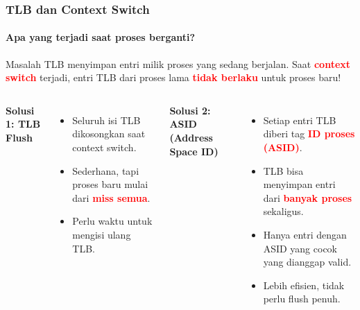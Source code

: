 \documentclass[t,aspectratio=169,xcolor=dvipsnames]{beamer}
\newcommand{\tem}[1]{\textbf{\textcolor{red}{#1}}}
\begin{document}
\begin{frame}
    \frametitle{TLB dan Context Switch}
    \framesubtitle{Apa yang terjadi saat proses berganti?}
    \small

    \begin{alertblock}{Masalah}
        TLB menyimpan entri milik proses yang sedang berjalan. Saat \tem{context switch} terjadi,
        entri TLB dari proses lama \tem{tidak berlaku} untuk proses baru!
    \end{alertblock}

    \vspace{0.2cm}
    \begin{columns}[T]
        \textbf{Solusi 1: TLB Flush}
        \begin{itemize}
            \item Seluruh isi TLB dikosongkan saat context switch.
            \item Sederhana, tapi proses baru mulai dari \tem{miss semua}.
            \item Perlu waktu untuk mengisi ulang TLB.
        \end{itemize}

        \textbf{Solusi 2: ASID (Address Space ID)}
        \begin{itemize}
            \item Setiap entri TLB diberi tag \tem{ID proses (ASID)}.
            \item TLB bisa menyimpan entri dari \tem{banyak proses} sekaligus.
            \item Hanya entri dengan ASID yang cocok yang dianggap valid.
            \item Lebih efisien, tidak perlu flush penuh.
        \end{itemize}
    \end{columns}
\end{frame}
\end{document}

